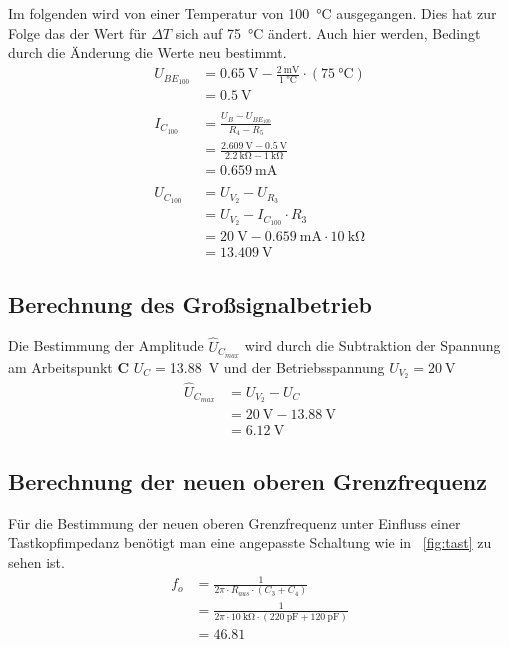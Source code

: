             Im folgenden wird von einer Temperatur von \SI{100}{\degreeCelsius} ausgegangen. Dies hat zur Folge das der Wert für \(\Delta T\) sich auf \SI{75}{\degreeCelsius} ändert.
            Auch hier werden, Bedingt durch die Änderung die Werte neu bestimmt.
            \begin{align*}
                U_{BE_{100}}&=\SI{0.65}{\volt} - \frac{\SI{2}{\mV}}{\SI{1}{\degreeCelsius}}\cdot(\SI{75}{\degreeCelsius})\\
                &=\SI{0.5}{\V} \\
                &\\
                I_{C_{100}} &= \frac{U_B-U_{BE_{100}}}{R_4-R_5}\\
                &=\frac{\SI{2.609}{\V}-\SI{0,5}{\V}}{\SI{2.2}{\kilo\ohm}-\SI{1}{\kilo\ohm}}\\
                &=\SI{0.659}{\milli\ampere}\\
                &\\
                U_{C_{100}} &= U_{V_2}-U_{R_3}\\
                &=U_{V_2}-I_{C_{100}}\cdot R_3\\
                &=\SI{20}{\V}-\SI{0.659}{\milli\ampere}\cdot \SI{10}{\kilo\ohm}\\
                &=\SI{13.409}{\V}
            \end{align*}
            \newpage
        \subsection{Berechnung des Großsignalbetrieb}
            Die Bestimmung der Amplitude \(\hat{U}_{C_{max}}\) wird durch die Subtraktion der Spannung am Arbeitspunkt \textbf{C} \(U_C=\)\SI{13.88}{\V} und der Betriebsspannung \(U_{V_2}= \SI{20}{\V}\)
            \begin{align*}
                \hat{U}_{C_{max}}&=U_{V_2}- U_C\\
                &=\SI{20}{\V}-\SI{13.88}{\V}\\
                &=\SI{6.12}{\V}
            \end{align*}
        \subsection{Berechnung der neuen oberen Grenzfrequenz}
            Für die Bestimmung der neuen oberen Grenzfrequenz unter Einfluss einer Tastkopfimpedanz benötigt man eine angepasste Schaltung wie in ~\ref{fig:tast} zu sehen ist. 
            \begin{align*}
                f_o&=\frac{1}{2\pi\cdot R_{aus}\cdot (C_3+C_4)}\\
                &=\frac{1}{2\pi\cdot \SI{10}{\kilo\ohm} \cdot (\SI{220}{\pico\farad}+\SI{120}{\pico\farad})}\\
                &=\SI{46.81}{}
            \end{align*}
            



